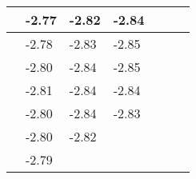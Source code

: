 \documentclass[a4paper,11pt]{report}
\begin{document}
\begin{table}[H]
\begin{center}
\begin{tabular}{|l|l|l|l|l|l|l|}
\hline
\hspace*{0.5cm}&\hspace*{0.5cm}-2.77&\hspace*{0.5cm}-2.82&\hspace*{0.5cm}-2.84&\hspace*{0.5cm}&\hspace*{0.5cm}\\
\hline
\hspace*{0.5cm}&\hspace*{0.5cm}-2.78&\hspace*{0.5cm}-2.83&\hspace*{0.5cm}-2.85&\hspace*{0.5cm}&\hspace*{0.5cm}\\
\hline
\hspace*{0.5cm}&\hspace*{0.5cm}-2.80&\hspace*{0.5cm}-2.84&\hspace*{0.5cm}-2.85&\hspace*{0.5cm}&\hspace*{0.5cm}\\
\hline
\hspace*{0.5cm}&\hspace*{0.5cm}-2.81&\hspace*{0.5cm}-2.84&\hspace*{0.5cm}-2.84&\hspace*{0.5cm}&\hspace*{0.5cm}\\
\hline
\hspace*{0.5cm}&\hspace*{0.5cm}-2.80&\hspace*{0.5cm}-2.84&\hspace*{0.5cm}-2.83&\hspace*{0.5cm}&\hspace*{0.5cm}\\
\hline
\hspace*{0.5cm}&\hspace*{0.5cm}-2.80&\hspace*{0.5cm}-2.82&\hspace*{0.5cm}&\hspace*{0.5cm}&\hspace*{0.5cm}\\
\hline
\hspace*{0.5cm}&\hspace*{0.5cm}-2.79&\hspace*{0.5cm}&\hspace*{0.5cm}&\hspace*{0.5cm}&\hspace*{0.5cm}\\
\hline
\end{tabular}
\label{table6}
\end{center}
\end{table}
\end{document}

